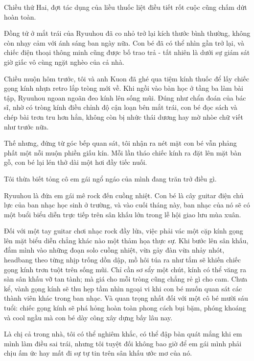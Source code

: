 ﻿\documentclass[../main.tex]{subfiles}
\begin{document}

Chiều thứ Hai, đợt tác dụng của liều thuốc liệt điều tiết rốt cuộc cũng chấm dứt hoàn toàn.

Đồng tử ở mắt trái của Ryuuhou đã co nhỏ trở lại kích thước bình thường, không còn nhạy cảm với ánh sáng ban ngày nữa. Con bé đã có thể nhìn gần trở lại, và chiếc điện thoại thông minh cũng được bố trao trả - tất nhiên là dưới sự giám sát giờ giấc vô cùng ngặt nghèo của cả nhà.

Chiều muộn hôm trước, tôi và anh Kuon đã ghé qua tiệm kính thuốc để lấy chiếc gọng kính nhựa retro lắp tròng mới về. Khi ngồi vào bàn học ở tầng ba làm bài tập, Ryuuhou ngoan ngoãn đeo kính lên sống mũi. Đúng như chẩn đoán của bác sĩ, nhờ có tròng kính điều chỉnh độ cận loạn bên mắt trái, con bé đọc sách và chép bài trơn tru hơn hẳn, không còn bị nhức thái dương hay mờ nhòe chữ viết như trước nữa.

Thế nhưng, đứng từ góc bếp quan sát, tôi nhận ra nét mặt con bé vẫn phảng phất một nỗi muộn phiền giấu kín. Mỗi lần tháo chiếc kính ra đặt lên mặt bàn gỗ, con bé lại lén thở dài một hơi đầy tiếc nuối.

Tôi thừa biết tỏng cô em gái ngổ ngáo của mình đang trăn trở điều gì.

Ryuuhou là đứa em gái mê rock đến cuồng nhiệt. Con bé là cây guitar điện chủ lực của ban nhạc học sinh ở trường, và vào cuối tháng này, ban nhạc của nó sẽ có một buổi biểu diễn trực tiếp trên sân khấu lớn trong lễ hội giao lưu mùa xuân.

Đối với một tay guitar chơi nhạc rock đầy lửa, việc phải vác một cặp kính gọng lên mặt biểu diễn chẳng khác nào một thảm họa thực sự. Khi bước lên sân khấu, đắm mình vào những đoạn solo cuồng nhiệt, vừa gảy đàn vừa nhảy nhót, headbang theo từng nhịp trống dồn dập, mồ hôi túa ra như tắm sẽ khiến chiếc gọng kính trơn tuột trên sống mũi. Chỉ cần sơ sẩy một chút, kính có thể văng ra sàn sân khấu vỡ tan tành; mà giá cho mỗi tròng cũng chẳng rẻ gì cho cam. Chưa kể, vành gọng kính sẽ thu hẹp tầm nhìn ngoại vi khi con bé muốn quan sát các thành viên khác trong ban nhạc. Và quan trọng nhất đối với một cô bé mười sáu tuổi: chiếc gọng kính sẽ phá hỏng hoàn toàn phong cách bụi bặm, phóng khoáng và cool ngầu mà con bé dày công xây dựng bấy lâu nay.

Là chị cả trong nhà, tôi có thể nghiêm khắc, có thể đập bàn quát mắng khi em mình làm điều sai trái, nhưng tôi tuyệt đối không bao giờ để em gái mình phải chịu ấm ức hay mất đi sự tự tin trên sân khấu ước mơ của nó.
\end{document}
